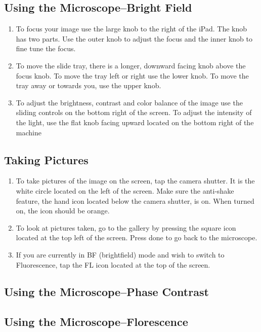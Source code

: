 \documentclass{article}
\begin{document}
\subsection{Using the Microscope--Bright Field} 

\begin{enumerate}
  \item To focus your image use the large knob to the right of the iPad. The knob has two parts. Use the outer knob to adjust the focus and the inner knob to fine tune the focus.
  \item To move the slide tray, there is a longer, downward facing knob above the focus knob. To move the tray left or right use the lower knob. To move the tray away or towards you, use the upper knob.
  \item To adjust the brightness, contrast and color balance of the image use the sliding controls on the bottom right of the screen. To adjust the intensity of the light, use the flat knob facing upward located on the bottom right of the machine
  
\end{enumerate}

\subsection{Taking Pictures}

\begin{enumerate}
  \item To take pictures of the image on the screen, tap the camera shutter. It is the white circle located on the left of the screen. Make sure the anti-shake feature, the hand icon located below the camera shutter, is on. When turned on, the icon should be orange.
  \item To look at pictures taken, go to the gallery by pressing the square icon located at the top left of the screen. Press done to go back to the microscope. 
  \item If you are currently in BF (brightfield) mode and wish to switch to Fluorescence, tap the FL icon located at the top of the screen.  
\end{enumerate}


\subsection{Using the Microscope--Phase Contrast}


\subsection{Using the Microscope--Florescence}
\end{document}
